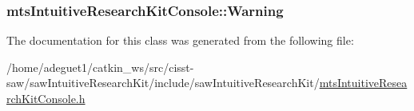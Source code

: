 \hypertarget{classmts_intuitive_research_kit_console_a79190bd57f9e19d6d287323898937c45}{
\subsubsection[{Warning}]{ mts\-Intuitive\-Research\-Kit\-Console\-::\-Warning}}\label{classmts_intuitive_research_kit_console_a79190bd57f9e19d6d287323898937c45}


The documentation for this class was generated from the following file\-:\begin{DoxyCompactItemize}
\item 
/home/adeguet1/catkin\-\_\-ws/src/cisst-\/saw/saw\-Intuitive\-Research\-Kit/include/saw\-Intuitive\-Research\-Kit/\hyperlink{mts_intuitive_research_kit_console_8h}{mts\-Intuitive\-Research\-Kit\-Console.\-h}\end{DoxyCompactItemize}
